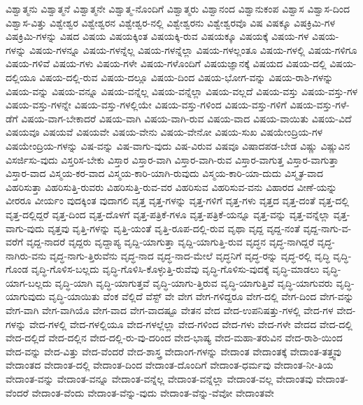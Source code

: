 {ವಿಶ್ವಾತ್ಮನು
ವಿಶ್ವಾತ್ಮನೆ
ವಿಶ್ವಾತ್ಮನೇ
ವಿಶ್ವಾತ್ಮ-ನೊಂದಿಗೆ
ವಿಶ್ವಾತ್ಮರು
ವಿಶ್ವಾನಂದ
ವಿಶ್ವಾನುಕಂಪ
ವಿಶ್ವಾಸ
ವಿಶ್ವಾಸ-ದಿಂದ
ವಿಶ್ವಾಸ-ವಿತ್ತು
ವಿಶ್ವೇಶ್ವರ
ವಿಶ್ವೇಶ್ವರನ
ವಿಶ್ವೇಶ್ವರ-ನಲ್ಲಿ
ವಿಶ್ವೇಶ್ವರನು
ವಿಶ್ವೇಶ್ವರವೊ
ವಿಷ
ವಿಷಕ್ಕೂ
ವಿಷಕ್ರಿಮಿ-ಗಳ
ವಿಷಕ್ರಿಮಿ-ಗಳನ್ನು
ವಿಷದ
ವಿಷಯ
ವಿಷಯಕ್ಕಿಂತ
ವಿಷಯಕ್ಕಿ-ರುವ
ವಿಷಯಕ್ಕೂ
ವಿಷಯಕ್ಕೆ
ವಿಷಯ-ಗಳ
ವಿಷಯ-ಗಳನ್ನು
ವಿಷಯ-ಗಳನ್ನೂ
ವಿಷಯ-ಗಳನ್ನೆಲ್ಲ
ವಿಷಯ-ಗಳನ್ನೆಲ್ಲಾ
ವಿಷಯ-ಗಳಲ್ಲಂತೂ
ವಿಷಯ-ಗಳಲ್ಲಿ
ವಿಷಯ-ಗಳಿಗೂ
ವಿಷಯ-ಗಳಿವೆ
ವಿಷಯ-ಗಳು
ವಿಷಯ-ಗಳೇ
ವಿಷಯ-ಗಳೊಂದಿಗೆ
ವಿಷಯಜ್ಞಾನಕ್ಕೆ
ವಿಷಯದ
ವಿಷಯ-ದಲ್ಲಿ
ವಿಷಯ-ದಲ್ಲಿಯೂ
ವಿಷಯ-ದಲ್ಲಿ-ರುವ
ವಿಷಯ-ದಲ್ಲೂ
ವಿಷಯ-ದಿಂದ
ವಿಷಯ-ಭೋಗ-ವನ್ನು
ವಿಷಯ-ರಾಶಿ-ಗಳನ್ನು
ವಿಷಯ-ವನ್ನು
ವಿಷಯ-ವನ್ನೂ
ವಿಷಯ-ವನ್ನೆಲ್ಲ
ವಿಷಯ-ವನ್ನೆಲ್ಲಾ
ವಿಷಯ-ವಲ್ಲದೆ
ವಿಷಯ-ವಸ್ತು
ವಿಷಯ-ವಸ್ತು-ಗಳ
ವಿಷಯ-ವಸ್ತು-ಗಳನ್ನೇ
ವಿಷಯ-ವಸ್ತು-ಗಳಲ್ಲಿಯೇ
ವಿಷಯ-ವಸ್ತು-ಗಳಿಂದ
ವಿಷಯ-ವಸ್ತು-ಗಳಿಗೆ
ವಿಷಯ-ವಸ್ತು-ಗಳೆ-ಡೆಗೆ
ವಿಷಯ-ವಾಗ-ಬೇಕಾದರೆ
ವಿಷಯ-ವಾಗಿ
ವಿಷಯ-ವಾಗಿ-ರುವ
ವಿಷಯ-ವಾದ
ವಿಷಯ-ವಾಯಿತು
ವಿಷಯ-ವಿದೆ
ವಿಷಯವೂ
ವಿಷಯವೆ
ವಿಷಯವೇ
ವಿಷಯ-ವೇನು
ವಿಷಯ-ವೇನೋ
ವಿಷಯ-ಸುಖ
ವಿಷಯೇಂದ್ರಿಯ-ಗಳ
ವಿಷಯೇಂದ್ರಿಯ-ಗಳನ್ನು
ವಿಷ-ವನ್ನು
ವಿಷ-ವಾಗು-ವುದು
ವಿಷ-ವಿರುವ
ವಿಷವೂ
ವಿಷಾದಪಡ-ಬೇಡ
ವಿಷ್ಣು
ವಿಷ್ಣುವಿನ
ವಿಸರ್ಜಿಸು-ವುದು
ವಿಸ್ತರಿಸ-ಬೇಕು
ವಿಸ್ತಾರ
ವಿಸ್ತಾರ-ವಾಗಿ
ವಿಸ್ತಾರ-ವಾಗಿ-ರುವ
ವಿಸ್ತಾರ-ವಾಗುತ್ತ
ವಿಸ್ತಾರ-ವಾಗುತ್ತಾ
ವಿಸ್ತಾರ-ವಾದ
ವಿಸ್ಮಯ-ಕರ-ವಾದ
ವಿಸ್ಮಯ-ಕಾರಿ-ಯಾಗಿ-ರುವುದು
ವಿಸ್ಮಯ-ಕಾರಿ-ಯಾ-ದುದು
ವಿಸ್ಮೃತ-ವಾದ
ವಿಹರಿಸುತ್ತಾ
ವಿಹರಿಸುತ್ತಿ-ರುವರು
ವಿಹರಿಸುತ್ತಿ-ರುವ-ವರ
ವಿಹರಿಸುವ
ವಿಹರಿಸುವ-ವನು
ವಿಹಾರದ
ವೀಣೆ-ಯನ್ನು
ವೀರರೂ
ವೀರ್ಯಂ
ವುದಕ್ಕಿಂತ
ವುದಾಗಲಿ
ವೃತ್ತ
ವೃತ್ತ-ಗಳನ್ನು
ವೃತ್ತ-ಗಳಿಗೆ
ವೃತ್ತ-ಗಳು
ವೃತ್ತದ
ವೃತ್ತ-ದಂತೆ
ವೃತ್ತ-ದಲ್ಲಿ
ವೃತ್ತ-ದಲ್ಲಿದ್ದರೆ
ವೃತ್ತ-ದಿಂದ
ವೃತ್ತ-ದೊಳಗೆ
ವೃತ್ತ-ಪತ್ರಿಕೆ-ಗಳೂ
ವೃತ್ತ-ಪತ್ರಿಕೆ-ಯನ್ನೂ
ವೃತ್ತ-ವನ್ನು
ವೃತ್ತ-ವನ್ನೆಲ್ಲಾ
ವೃತ್ತ-ವಾಗು-ವುದು
ವೃತ್ತವು
ವೃತ್ತಿ-ಗಳನ್ನು
ವೃತ್ತಿ-ಯಂತೆ
ವೃತ್ತಿ-ರೂಪ-ದಲ್ಲಿ-ರುವ
ವೃಥಾ
ವೃದ್ದ
ವೃದ್ದ-ನಂತೆ
ವೃದ್ದ-ನಾಗು-ವ-ವರೆಗೆ
ವೃದ್ದ-ನಾದರೆ
ವೃದ್ದರು
ವೃದ್ದಾಪ್ಯ
ವೃದ್ದಿ-ಯಾಗುತ್ತಾ
ವೃದ್ದಿ-ಯಾಗುತ್ತಿ-ರುವ
ವೃದ್ಧನ
ವೃದ್ಧ-ನಾಗಿದ್ದರೆ
ವೃದ್ಧ-ನಾಗಿರು-ವನು
ವೃದ್ಧ-ನಾಗು-ತ್ತಿರುವೆನು
ವೃದ್ಧ-ನಾದ
ವೃದ್ಧ-ನಾದ-ಮೇಲೆ
ವೃದ್ಧನಿಗೆ
ವೃದ್ಧ-ರನ್ನು
ವೃದ್ಧ-ರಲ್ಲಿ
ವೃದ್ಧಿ
ವೃದ್ಧಿ-ಗೊಂಡ
ವೃದ್ಧಿ-ಗೊಳಿಸ-ಬಲ್ಲದು
ವೃದ್ಧಿ-ಗೊಳಿಸಿ-ಕೊಳ್ಳುತ್ತಿ-ರುವೆವು
ವೃದ್ಧಿ-ಗೊಳಿಸು-ವುದಕ್ಕೆ
ವೃದ್ಧಿ-ಮಾಡಲು
ವೃದ್ಧಿ-ಯಾಗ-ಬಲ್ಲದು
ವೃದ್ಧಿ-ಯಾಗಿ
ವೃದ್ಧಿ-ಯಾಗುತ್ತವೆ
ವೃದ್ಧಿ-ಯಾಗು-ತ್ತಿರುವ
ವೃದ್ಧಿ-ಯಾಗುತ್ತಿವೆ
ವೃದ್ಧಿ-ಯಾಗುವರು
ವೃದ್ಧಿ-ಯಾಗುವುದು
ವೃದ್ಧಿ-ಯಾಯಿತು
ವೆಂಕ
ವೆಲ್ಲಿದೆ
ವೆಸ್ಟ್
ವೇ
ವೇಗ
ವೇಗ-ಗಳಿದ್ದರೂ
ವೇಗ-ದಲ್ಲಿ
ವೇಗ-ದಿಂದ
ವೇಗ-ವನ್ನು
ವೇಗ-ವಾಗಿ
ವೇಗ-ವಾಗಿಯೊ
ವೇಗ-ವಾದ
ವೇಗ-ವಾದಷ್ಟೂ
ವೇತನ
ವೇದ
ವೇದ-ಉಪನಿಷತ್ತು-ಗಳಲ್ಲಿ
ವೇದ-ಗಳ
ವೇದ-ಗಳನ್ನು
ವೇದ-ಗಳಲ್ಲಿ
ವೇದ-ಗಳಲ್ಲಿಯೂ
ವೇದ-ಗಳಲ್ಲೆಲ್ಲಾ
ವೇದ-ಗಳಿಂದ
ವೇದ-ಗಳು
ವೇದ-ಗಳೇ
ವೇದದ
ವೇದ-ದಲ್ಲಿ
ವೇದ-ದಲ್ಲಿದೆ
ವೇದ-ದಲ್ಲಿನ
ವೇದ-ದಲ್ಲಿ-ರು-ವು-ದರಿಂದ
ವೇದ-ಭಾಷ್ಯ
ವೇದ-ಮಹಾ-ತರುವಿನ
ವೇದ-ರಾಶಿ-ಯಿಂದ
ವೇದ-ವನ್ನು
ವೇದ-ವಿತ್ತು
ವೇದ-ವೆಂದರೆ
ವೇದ-ಶಾಸ್ತ್ರ
ವೇದಾಂಗ-ಗಳನ್ನು
ವೇದಾಂತ
ವೇದಾಂತಕ್ಕೆ
ವೇದಾಂತ-ತತ್ತ್ವವು
ವೇದಾಂತದ
ವೇದಾಂತ-ದಲ್ಲಿ
ವೇದಾಂತ-ದಿಂದ
ವೇದಾಂತ-ದೊಂದಿಗೆ
ವೇದಾಂತ-ಧರ್ಮವು
ವೇದಾಂತ-ನೀ-ತಿಯ
ವೇದಾಂತ-ವನ್ನು
ವೇದಾಂತ-ವನ್ನೂ
ವೇದಾಂತ-ವನ್ನೆಲ್ಲ
ವೇದಾಂತ-ವನ್ನೆಲ್ಲಾ
ವೇದಾಂತ-ವಲ್ಲ
ವೇದಾಂತವು
ವೇದಾಂತ-ವೆಂದರೆ
ವೇದಾಂತ-ವೆಂದು
ವೇದಾಂತ-ವೆನ್ನು-ವುದು
ವೇದಾಂತ-ವೆನ್ನು-ವೆವೋ
ವೇದಾಂತವೇ
}
